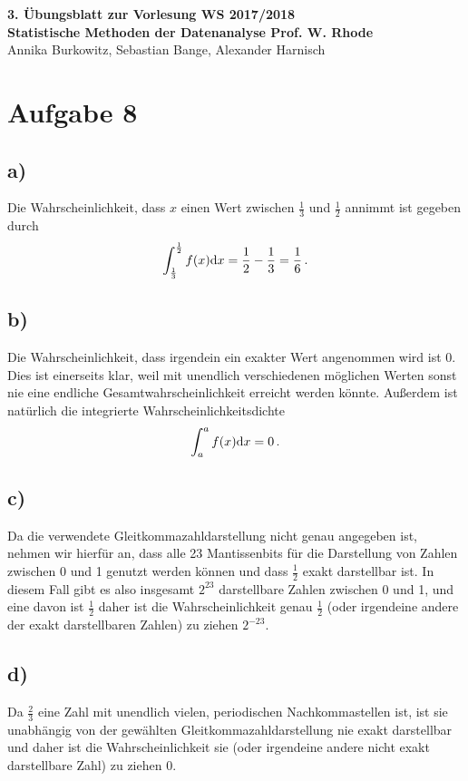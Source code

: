 \documentclass[a4paper, 11pt]{article}
\begin{document}
\noindent
\large{\textbf{3. Übungsblatt zur Vorlesung \hfill WS 2017/2018 \\
Statistische Methoden der Datenanalyse \hfill Prof. W. Rhode}} \\
Annika Burkowitz, Sebastian Bange, Alexander Harnisch \\
\noindent\makebox[\linewidth]{\rule{\textwidth}{0.4pt}}

\section*{Aufgabe 8}
\subsection*{a)}
Die Wahrscheinlichkeit, dass $x$ einen Wert zwischen $\frac{1}{3}$ und $\frac{1}{2}$ annimmt ist gegeben durch
\begin{equation}
    \int_{\frac{1}{3}}^{\frac{1}{2}} f(x) \textup{d}x = \frac{1}{2} - \frac{1}{3} = \frac{1}{6} \,.
\end{equation}

\subsection*{b)}
Die Wahrscheinlichkeit, dass irgendein ein exakter Wert angenommen wird ist 0. Dies ist einerseits klar, weil mit unendlich verschiedenen möglichen Werten sonst nie eine endliche Gesamtwahrscheinlichkeit erreicht werden könnte. Außerdem ist natürlich die integrierte Wahrscheinlichkeitsdichte
\begin{equation}
    \int_{a}^{a} f(x) \textup{d}x = 0 \,.
\end{equation}

\subsection*{c)}
Da die verwendete Gleitkommazahldarstellung nicht genau angegeben ist, nehmen wir hierfür an, dass alle 23 Mantissenbits für die Darstellung von Zahlen zwischen 0 und 1 genutzt werden können und dass $\frac{1}{2}$ exakt darstellbar ist. In diesem Fall gibt es also insgesamt $2^{23}$ darstellbare Zahlen zwischen 0 und 1, und eine davon ist $\frac{1}{2}$ daher ist die Wahrscheinlichkeit genau $\frac{1}{2}$ (oder irgendeine andere der exakt darstellbaren Zahlen) zu ziehen $2^{-23}$.

\subsection*{d)}
Da $\frac{2}{3}$ eine Zahl mit unendlich vielen, periodischen Nachkommastellen ist, ist sie unabhängig von der gewählten Gleitkommazahldarstellung nie exakt darstellbar und daher ist die Wahrscheinlichkeit sie (oder irgendeine andere nicht exakt darstellbare Zahl) zu ziehen 0.
\end{document}
